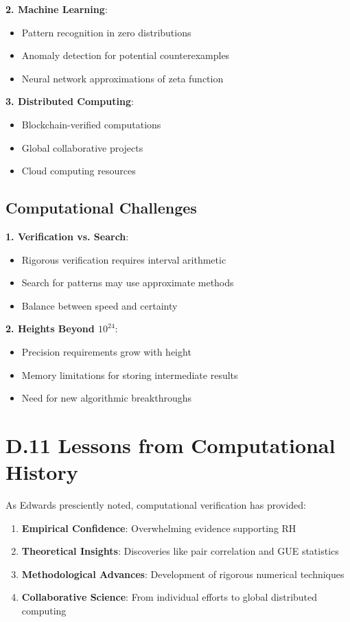 \textbf{2. Machine Learning}:
\begin{itemize}
\item Pattern recognition in zero distributions
\item Anomaly detection for potential counterexamples
\item Neural network approximations of zeta function
\end{itemize}

\textbf{3. Distributed Computing}:
\begin{itemize}
\item Blockchain-verified computations
\item Global collaborative projects
\item Cloud computing resources
\end{itemize}

\subsection{Computational Challenges}

\textbf{1. Verification vs. Search}:
\begin{itemize}
\item Rigorous verification requires interval arithmetic
\item Search for patterns may use approximate methods
\item Balance between speed and certainty
\end{itemize}

\textbf{2. Heights Beyond $10^{24}$}:
\begin{itemize}
\item Precision requirements grow with height
\item Memory limitations for storing intermediate results
\item Need for new algorithmic breakthroughs
\end{itemize}

\section{D.11 Lessons from Computational History}

As Edwards \cite{edwards1974} presciently noted, computational verification has provided:

\begin{enumerate}
\item \textbf{Empirical Confidence}: Overwhelming evidence supporting RH
\item \textbf{Theoretical Insights}: Discoveries like pair correlation and GUE statistics
\item \textbf{Methodological Advances}: Development of rigorous numerical techniques
\item \textbf{Collaborative Science}: From individual efforts to global distributed computing
\end{enumerate}

